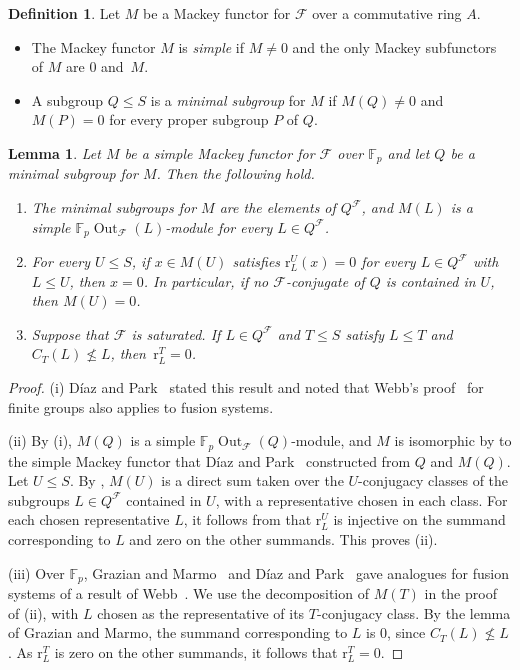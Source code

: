 \documentclass[10pt]{amsart}
\newtheorem{lemma}[theorem]{Lemma}
\theoremstyle{definition}
\newtheorem{definition}[theorem]{Definition}
\DeclareMathOperator{\Out}{Out}
\numberwithin{equation}{section}
\renewcommand{\le}{\leqslant}
\newcommand{\F}{\mathcal F}
\begin{document}
\begin{definition}\label{def:simple-minimal}
Let $M$ be a Mackey functor for $\F$ over a commutative ring $A$.
\begin{itemize}
\item The Mackey functor $M$ is \emph{simple} if $M\ne0$ and the only Mackey subfunctors of $M$ are $0$ and~$M$.
\item A subgroup $Q\le S$ is a \emph{minimal subgroup} for $M$ if $M(Q)\ne0$ and $M(P)=0$ for every proper subgroup $P$ of $Q$.
\end{itemize}
\end{definition}

\begin{lemma}\label{lem:simple}
Let $M$ be a simple Mackey functor for $\F$ over $\mathbb{F}_p$ and let $Q$ be a minimal subgroup for $M$. Then the following hold.
\begin{enumerate}[label=\textup{(\roman*)}]
\item The minimal subgroups for $M$ are the elements of $Q^\F$, and $M(L)$ is a simple $\mathbb{F}_p\Out_\F(L)$-module for every $L\in Q^\F$.
\item For every $U\le S$, if $x\in M(U)$ satisfies $\mathrm{r}^U_L(x)=0$ for every $L\in Q^\F$ with $L\le U$, then $x=0$. In particular, if no $\F$-conjugate of $Q$ is contained in $U$, then $M(U)=0$.
\item Suppose that $\F$ is saturated. If $L\in Q^\F$ and $T\le S$ satisfy $L\le T$ and $C_T(L)\not\le L$, then~$\mathrm{r}^T_L=0$.
\end{enumerate}
\end{lemma}

\begin{proof}
(i) D\'iaz and Park~\cite[Proposition~3.1]{DP} stated this result and noted that Webb's proof~\cite[Proposition~2.1]{Webb1993} for finite groups also applies to fusion systems.

(ii) By (i), $M(Q)$ is a simple $\mathbb{F}_p\Out_\F(Q)$-module, and $M$ is isomorphic by \cite[Proposition~3.2]{DP} to the simple Mackey functor that D\'iaz and Park~\cite[\S3]{DP} constructed from $Q$ and $M(Q)$. Let $U\le S$. By \cite[formula~(4)]{DP}, $M(U)$ is a direct sum taken over the $U$-conjugacy classes of the subgroups $L\in Q^\F$ contained in $U$, with a representative chosen in each class. For each chosen representative $L$, it follows from \cite[formula~(6)]{DP} that $\mathrm{r}^U_L$ is injective on the summand corresponding to $L$ and zero on the other summands. This proves (ii).

(iii) Over $\mathbb{F}_p$, Grazian and Marmo~\cite[Lemma~2.9]{GM} and D\'iaz and Park~\cite[Corollary~3.4]{DP} gave analogues for fusion systems of a result of Webb~\cite[Proposition~2.8]{Webb1993}. We use the decomposition of $M(T)$ in the proof of (ii), with $L$ chosen as the representative of its $T$-conjugacy class. By the lemma of Grazian and Marmo, the summand corresponding to $L$ is $0$, since $C_T(L)\not\le L$. As $\mathrm{r}^T_L$ is zero on the other summands, it follows that $\mathrm{r}^T_L=0$.
\end{proof}
\end{document}
